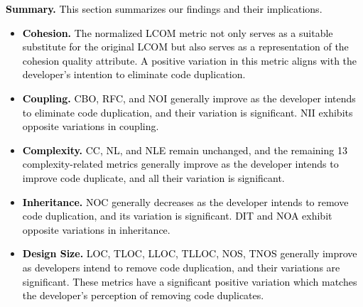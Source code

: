 

\noindent\textbf{\textcolor{black}{Summary.}} \textcolor{black}{This \textcolor{black}{section} summarizes our findings and their implications.}

\begin{itemize}
    \item \textcolor{black}{\textbf{Cohesion.} The normalized LCOM metric not only serves as a suitable substitute for the original LCOM but also serves as a representation of the cohesion quality attribute. A positive variation in this metric aligns with the developer's intention to eliminate code duplication.}
    \item \textcolor{black}{\textbf{Coupling.} CBO, RFC, and NOI generally improve as the developer intends to eliminate code duplication, and their variation is significant. NII exhibits opposite variations in
coupling.}
    \item \textcolor{black}{\textbf{Complexity.} CC, NL, and NLE remain unchanged, and the remaining 13 complexity-related metrics generally improve as the developer intends to improve code duplicate, and all their variation is significant.}
    \item \textcolor{black}{\textbf{Inheritance.} NOC generally decreases as the developer intends to remove code duplication, and its variation is significant. DIT and NOA exhibit opposite variations in inheritance.}
    \item \textcolor{black}{\textbf{Design Size.} LOC, TLOC, LLOC, TLLOC, NOS, TNOS generally improve as developers intend to remove code duplication, and their variations are significant. These metrics have a significant positive variation which matches the developer's perception of removing code duplicates.}
\end{itemize}


